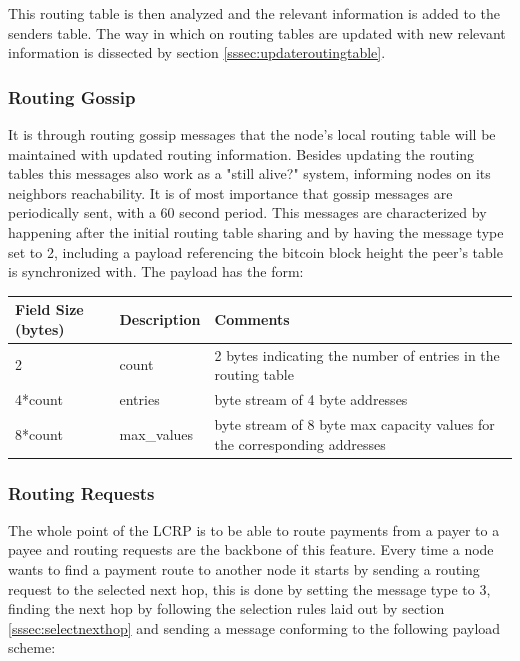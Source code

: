 This routing table is then analyzed and the relevant information is added to the senders table. The way in which on routing tables are updated with new relevant information is dissected by section \ref{sssec:updateroutingtable}.

\subsubsection{Routing Gossip}

It is through routing gossip messages that the node's local routing table will be maintained with updated routing information. Besides updating the routing tables this messages also work as a "still alive?" system, informing nodes on its neighbors reachability. It is of most importance that gossip messages are periodically sent, with a 60 second period. This messages are characterized by happening after the initial routing table sharing and by having the message type set to 2, including a payload referencing the bitcoin block height the peer's table is synchronized with. The payload has the form:

\begin{table}[H]
\begin{tabular}{|l|l|l|}
\hline
\rowcolor[HTML]{C0C0C0} 
Field Size (bytes) & Description & Comments                                                                               \\ \hline
2                  & count       & 2 bytes indicating the number of entries in the routing table            \\ \hline
4*count            & entries     & byte stream of 4 byte addresses                                         \\ \hline
8*count            & max\_values & byte stream of 8 byte max capacity values for the corresponding addresses \\ \hline
\end{tabular}
\end{table}

\subsubsection{Routing Requests}

The whole point of the LCRP is to be able to route payments from a payer to a payee and routing requests are the backbone of this feature. Every time a node wants to find a payment route to another node it starts by sending a routing request to the selected next hop, this is done by setting the message type to 3, finding the next hop by following the selection rules laid out by section \ref{sssec:selectnexthop} and sending a message conforming to the following payload scheme: \\

